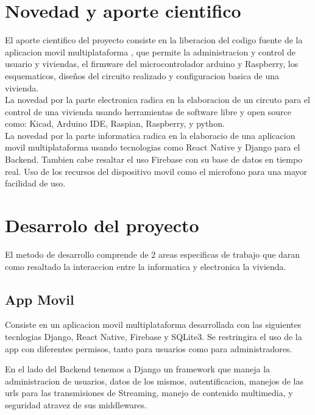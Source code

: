 \documentclass[letterpaper,12pt]{article}
\begin{document}
{		\section{Novedad y aporte cientifico}
		
		El aporte cientifico del proyecto consiste en la liberacion del codigo fuente de la aplicacion movil multiplataforma , que permite la administracion y control de usuario y viviendas,  el firmware del microcontrolador  arduino y Raspberry, los esquematicos, diseños del circuito realizado y configuracion basica de una vivienda.\\
		
		La novedad por la parte electronica radica en la elaboracion de un circuto para el control de una vivienda usando herramientas de software libre y open source como: Kicad, Arduino IDE, Raspian, Raspberry, y python.\\
		
		La novedad por la parte informatica radica en la elaboracio de una aplicacion movil multiplataforma usando tecnologias como React Native y Django para el Backend. Tambien cabe resaltar el uso  Firebase con su base de datos en tiempo real. Uso de los recursos del dispositivo movil como el microfono para una mayor facilidad de uso.\\
		
		
		
		
		\section{Desarrolo del proyecto}
		El metodo de desarrollo comprende de 2 areas especificas de trabajo que daran como resaltado la interaccion entre la informatica y electronica la vivienda.
		
		
		\subsection{App Movil}
		
		Consiste en un aplicacion movil multiplataforma desarrollada con las siguientes tecnlogias Django, React Native, Firebase y SQLite3.
		Se restringira el uso de la app con diferentes permisos, tanto para usuarios como para administradores.
		
		En el lado del Backend tenemos a Django un framework que maneja la administracion de usuarios, datos de los mismos, autentificacion, manejos de las urls para las transmisiones de Streaming, manejo de contenido multimedia, y seguridad atravez de sus middlewares.
		
}
\end{document}
